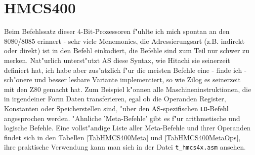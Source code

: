 \documentclass[12pt,a4paper,twoside]{report}
\newcommand{\tty}[1]{{\tt #1}}
\newcommand{\asname}{AS}
\begin{document}

\section{HMCS400}

Beim Befehlssatz dieser 4-Bit-Prozessoren f"uhlte ich mich
spontan an den 8080/8085 erinnert - sehr viele Menemonics, die
Adressierungsart (z.B.  indirekt oder direkt) ist in den Befehl
einkodiert, die Befehle sind zum Teil nur schwer zu merken.
Nat"urlich unterst"utzt \asname{} diese Syntax, wie Hitachi sie
seinerzeit definiert hat, ich habe aber zus"atzlich f"ur die
meisten Befehle eine - finde ich - sch"onere und besser lesbare
Variante implementiert, so wie Zilog es seinerzeit mit den Z80
gemacht hat.  Zum Beispiel k"onnen alle Maschineninstruktionen,
die in irgendeiner Form Daten transferieren, egal ob die
Operanden Register, Konstanten oder Speicherstellen sind, "uber den
\asname{}-spezifischen \tty{LD}-Befehl angesprochen werden.  "Ahnliche
'Meta-Befehle' gibt es f"ur arithmetische und logische Befehle.
Eine vollst"andige Liste aller Meta-Befehle und ihrer Operanden
findet sich in den Tabellen \ref{TabHMCS400Meta} und
\ref{TabHMCS400MetaOps}, ihre praktische Verwendung kann man sich
in der Datei \tty{t\_hmcs4x.asm} ansehen.
\end{document}
